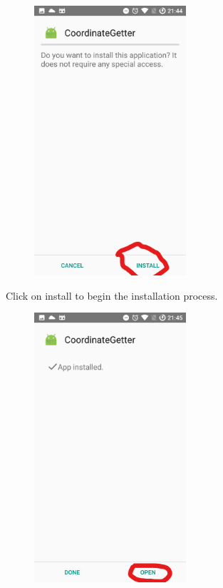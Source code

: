 \documentclass[fontsize=25pt]{scrbook}
\begin{document}
	\newpage
	\begin{center}
\begin{figure}
		\includegraphics[height=10cm]{Screenshot_5_LI.jpg}
		
		\end{figure}
	
	Click on install to begin the installation process.

	\end{center}
	\newpage
	\begin{center}
\begin{figure}
		\includegraphics[height=10cm]{Screenshot_7_LI.jpg}
		
		\end{figure}
	\end{center}
\end{document}

